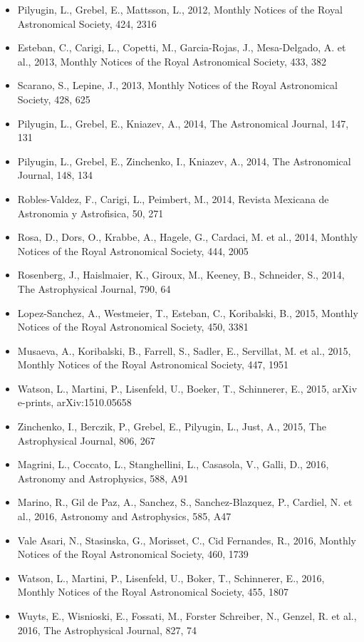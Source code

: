\documentclass{letter}
\begin{document}
\begin{enumerate}
\begin{itemize}
\item Pilyugin, L., Grebel, E., Mattsson, L., 2012, Monthly Notices of the Royal Astronomical Society, 424, 2316
\item Esteban, C., Carigi, L., Copetti, M., Garcia-Rojas, J., Mesa-Delgado, A. et al., 2013, Monthly Notices of the Royal Astronomical Society, 433, 382
\item Scarano, S., Lepine, J., 2013, Monthly Notices of the Royal Astronomical Society, 428, 625
\item Pilyugin, L., Grebel, E., Kniazev, A., 2014, The Astronomical Journal, 147, 131
\item Pilyugin, L., Grebel, E., Zinchenko, I., Kniazev, A., 2014, The Astronomical Journal, 148, 134
\item Robles-Valdez, F., Carigi, L., Peimbert, M., 2014, Revista Mexicana de Astronomia y Astrofisica, 50, 271
\item Rosa, D., Dors, O., Krabbe, A., Hagele, G., Cardaci, M. et al., 2014, Monthly Notices of the Royal Astronomical Society, 444, 2005
\item Rosenberg, J., Haislmaier, K., Giroux, M., Keeney, B., Schneider, S., 2014, The Astrophysical Journal, 790, 64
\item Lopez-Sanchez, A., Westmeier, T., Esteban, C., Koribalski, B., 2015, Monthly Notices of the Royal Astronomical Society, 450, 3381
\item Musaeva, A., Koribalski, B., Farrell, S., Sadler, E., Servillat, M. et al., 2015, Monthly Notices of the Royal Astronomical Society, 447, 1951
\item Watson, L., Martini, P., Lisenfeld, U., Boeker, T., Schinnerer, E., 2015, arXiv e-prints, arXiv:1510.05658
\item Zinchenko, I., Berczik, P., Grebel, E., Pilyugin, L., Just, A., 2015, The Astrophysical Journal, 806, 267
\item Magrini, L., Coccato, L., Stanghellini, L., Casasola, V., Galli, D., 2016, Astronomy and Astrophysics, 588, A91
\item Marino, R., Gil de Paz, A., Sanchez, S., Sanchez-Blazquez, P., Cardiel, N. et al., 2016, Astronomy and Astrophysics, 585, A47
\item Vale Asari, N., Stasinska, G., Morisset, C., Cid Fernandes, R., 2016, Monthly Notices of the Royal Astronomical Society, 460, 1739
\item Watson, L., Martini, P., Lisenfeld, U., Boker, T., Schinnerer, E., 2016, Monthly Notices of the Royal Astronomical Society, 455, 1807
\item Wuyts, E., Wisnioski, E., Fossati, M., Forster Schreiber, N., Genzel, R. et al., 2016, The Astrophysical Journal, 827, 74

\end{itemize}
\end{enumerate}
\end{document}

